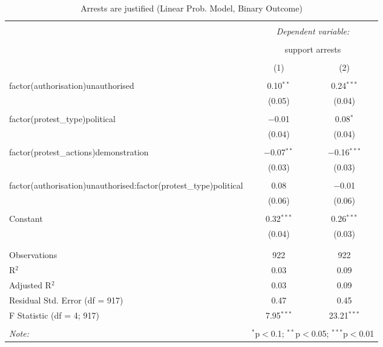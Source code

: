 
\begin{table}[!htbp] \centering 
  \caption{Arrests are justified (Linear Prob. Model, Binary Outcome)} 
  \label{} 
\begin{tabular}{@{\extracolsep{5pt}}lcc} 
\\[-1.8ex]\hline 
\hline \\[-1.8ex] 
 & \multicolumn{2}{c}{\textit{Dependent variable:}} \\ 
\cline{2-3} 
\\[-1.8ex] & \multicolumn{2}{c}{support arrests} \\ 
\\[-1.8ex] & (1) & (2)\\ 
\hline \\[-1.8ex] 
 factor(authorisation)unauthorised & 0.10$^{**}$ & 0.24$^{***}$ \\ 
  & (0.05) & (0.04) \\ 
  & & \\ 
 factor(protest\_type)political & $-$0.01 & 0.08$^{*}$ \\ 
  & (0.04) & (0.04) \\ 
  & & \\ 
 factor(protest\_actions)demonstration & $-$0.07$^{**}$ & $-$0.16$^{***}$ \\ 
  & (0.03) & (0.03) \\ 
  & & \\ 
 factor(authorisation)unauthorised:factor(protest\_type)political & 0.08 & $-$0.01 \\ 
  & (0.06) & (0.06) \\ 
  & & \\ 
 Constant & 0.32$^{***}$ & 0.26$^{***}$ \\ 
  & (0.04) & (0.03) \\ 
  & & \\ 
\hline \\[-1.8ex] 
Observations & 922 & 922 \\ 
R$^{2}$ & 0.03 & 0.09 \\ 
Adjusted R$^{2}$ & 0.03 & 0.09 \\ 
Residual Std. Error (df = 917) & 0.47 & 0.45 \\ 
F Statistic (df = 4; 917) & 7.95$^{***}$ & 23.21$^{***}$ \\ 
\hline 
\hline \\[-1.8ex] 
\textit{Note:}  & \multicolumn{2}{r}{$^{*}$p$<$0.1; $^{**}$p$<$0.05; $^{***}$p$<$0.01} \\ 
\end{tabular} 
\end{table} 
